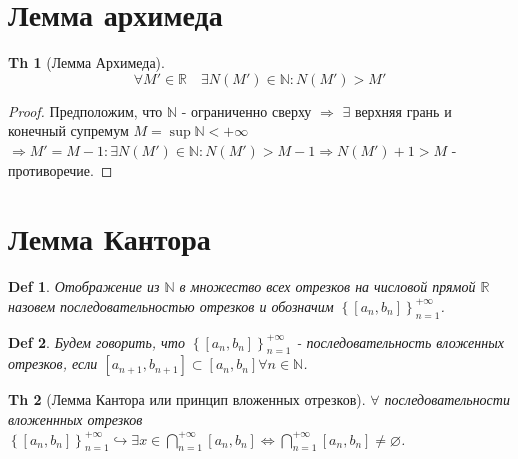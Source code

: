 \documentclass[a5paper, 10pt]{article}
\theoremstyle{plain}
\newtheorem*{theorem}{Th}
\newtheorem{definition}{Def}
\newcommand{\N}{\mathbb N}
\newcommand{\R}{\mathbb R}
\newcommand{\hrarrow}{\hookrightarrow}
\newcommand{\Rarrow}{\Rightarrow}
\newcommand{\Lrarrow}{\Leftrightarrow}
\begin{document}
    \section{Лемма архимеда}

    \begin{theorem}[Лемма Архимеда]
    \[ \forall M' \in \R \quad \exists N(M') \in \N: N(M') > M' \]
    \end{theorem}

    \begin{proof}
    Предположим, что $ \N $ - ограниченно сверху $ \Rarrow $ $ \exists $ верхняя грань и конечный
    супремум $ M = \sup \N < + \infty $
    $ \Rarrow M' = M - 1: \exists N(M') \in \N: N(M') > M - 1 \Rarrow
    N(M') + 1 > M $ - противоречие.
    \end{proof}

    \section{Лемма Кантора}

    \begin{definition}
    Отображение из $ \N $ в множество всех отрезков на числовой прямой $ \R $ назовем
    последовательностью отрезков и обозначим
    $ \left\{ \left[ a_n, b_n \right] \right\}_{n=1}^{+\infty} $.
    \end{definition}

    \begin{definition}
    Будем говорить, что
    $ \left\{ \left[ a_n, b_n \right] \right\}_{n=1}^{+\infty} $
    - последовательность вложенных отрезков, если
    $
    \left[ a_{n+1}, b_{n+1} \right]
    \subset
    \left[ a_{n}, b_{n} \right]
    \forall n \in \N
    $.
    \end{definition}

    \begin{theorem}[Лемма Кантора или принцип вложенных отрезков]
        $ \forall $ последовательности вложеннных отрезков
    $
    \left\{ \left[ a_n, b_n \right] \right\}_{n=1}^{+\infty} \hrarrow
    \exists x \in
    \bigcap\limits_{n=1}^{+\infty}
    \left[ a_{n}, b_{n} \right]
    \Lrarrow
    \bigcap\limits_{n=1}^{+\infty}
    \left[ a_{n}, b_{n} \right]
    \neq \varnothing
    $.
    \end{theorem}
\end{document}
